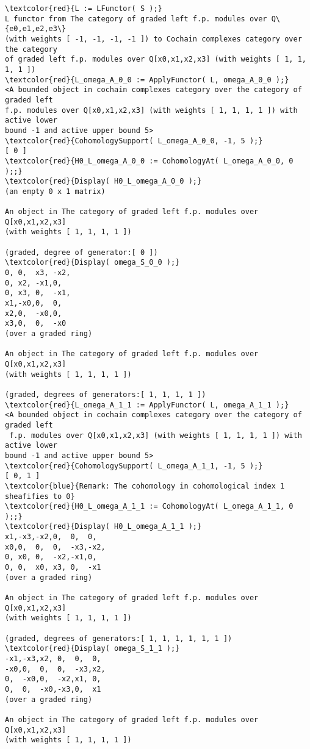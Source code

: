 \documentclass[16pt,a4paper]{extarticle}
\theoremstyle{definition}
\begin{document}
\begin{Verbatim}[commandchars=\\\{\}]
\textcolor{red}{L := LFunctor( S );}
L functor from The category of graded left f.p. modules over Q\{e0,e1,e2,e3\} 
(with weights [ -1, -1, -1, -1 ]) to Cochain complexes category over the category 
of graded left f.p. modules over Q[x0,x1,x2,x3] (with weights [ 1, 1, 1, 1 ])
\textcolor{red}{L_omega_A_0_0 := ApplyFunctor( L, omega_A_0_0 );}
<A bounded object in cochain complexes category over the category of graded left
f.p. modules over Q[x0,x1,x2,x3] (with weights [ 1, 1, 1, 1 ]) with active lower
bound -1 and active upper bound 5>
\textcolor{red}{CohomologySupport( L_omega_A_0_0, -1, 5 );}
[ 0 ]
\textcolor{red}{H0_L_omega_A_0_0 := CohomologyAt( L_omega_A_0_0, 0 );;}
\textcolor{red}{Display( H0_L_omega_A_0_0 );}
(an empty 0 x 1 matrix)

An object in The category of graded left f.p. modules over Q[x0,x1,x2,x3] 
(with weights [ 1, 1, 1, 1 ])

(graded, degree of generator:[ 0 ])
\textcolor{red}{Display( omega_S_0_0 );}
0, 0,  x3, -x2,
0, x2, -x1,0,  
0, x3, 0,  -x1,
x1,-x0,0,  0,  
x2,0,  -x0,0,  
x3,0,  0,  -x0 
(over a graded ring)

An object in The category of graded left f.p. modules over Q[x0,x1,x2,x3] 
(with weights [ 1, 1, 1, 1 ])

(graded, degrees of generators:[ 1, 1, 1, 1 ])
\textcolor{red}{L_omega_A_1_1 := ApplyFunctor( L, omega_A_1_1 );}
<A bounded object in cochain complexes category over the category of graded left
 f.p. modules over Q[x0,x1,x2,x3] (with weights [ 1, 1, 1, 1 ]) with active lower
bound -1 and active upper bound 5>
\textcolor{red}{CohomologySupport( L_omega_A_1_1, -1, 5 );}
[ 0, 1 ]
\textcolor{blue}{Remark: The cohomology in cohomological index 1 sheafifies to 0}
\textcolor{red}{H0_L_omega_A_1_1 := CohomologyAt( L_omega_A_1_1, 0 );;}
\textcolor{red}{Display( H0_L_omega_A_1_1 );}
x1,-x3,-x2,0,  0,  0,  
x0,0,  0,  0,  -x3,-x2,
0, x0, 0,  -x2,-x1,0,  
0, 0,  x0, x3, 0,  -x1 
(over a graded ring)

An object in The category of graded left f.p. modules over Q[x0,x1,x2,x3] 
(with weights [ 1, 1, 1, 1 ])

(graded, degrees of generators:[ 1, 1, 1, 1, 1, 1 ])
\textcolor{red}{Display( omega_S_1_1 );}
-x1,-x3,x2, 0,  0,  0, 
-x0,0,  0,  0,  -x3,x2,
0,  -x0,0,  -x2,x1, 0, 
0,  0,  -x0,-x3,0,  x1 
(over a graded ring)

An object in The category of graded left f.p. modules over Q[x0,x1,x2,x3] 
(with weights [ 1, 1, 1, 1 ])


\end{Verbatim}
\end{document}
